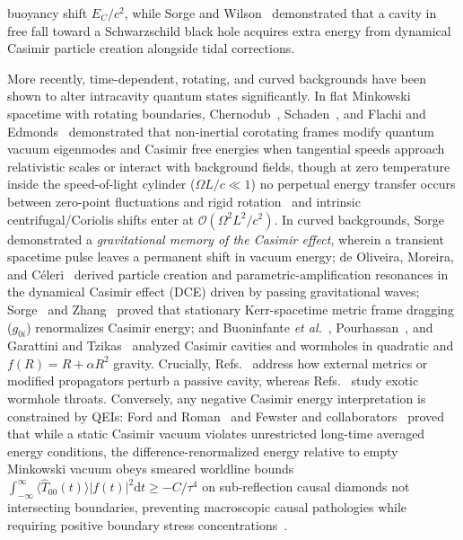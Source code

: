 \documentclass[aps,prd,twocolumn,10pt,showkeys,nofootinbib,floatfix,longbibliography]{revtex4-2}
\newcommand{\dd}{\mathrm{d}}
\begin{document}
buoyancy shift $E_C/c^2$, while Sorge and Wilson~\cite{sorge2019,wilson2020prd} demonstrated that a cavity in free fall toward a Schwarzschild black hole acquires extra energy from dynamical Casimir particle creation alongside tidal corrections.

More recently, time-dependent, rotating, and curved backgrounds have been shown to alter intracavity quantum states significantly. In flat Minkowski spacetime with rotating boundaries, Chernodub~\cite{chernodub2013prd}, Schaden~\cite{schaden2012arxiv}, and Flachi and Edmonds~\cite{flachi2023prd} demonstrated that non-inertial corotating frames modify quantum vacuum eigenmodes and Casimir free energies when tangential speeds approach relativistic scales or interact with background fields, though at zero temperature inside the speed-of-light cylinder ($\Omega L/c \ll 1$) no perpetual energy transfer occurs between zero-point fluctuations and rigid rotation~\cite{schaden2012arxiv} and intrinsic centrifugal/Coriolis shifts enter at $\mathcal{O}(\Omega^2 L^2/c^2)$. In curved backgrounds, Sorge~\cite{sorge2023memory} demonstrated a \emph{gravitational memory of the Casimir effect}, wherein a transient spacetime pulse leaves a permanent shift in vacuum energy; de Oliveira, Moreira, and Céleri~\cite{deoliveira2026entropy} derived particle creation and parametric-amplification resonances in the dynamical Casimir effect (DCE) driven by passing gravitational waves; Sorge~\cite{sorge2014kerr} and Zhang~\cite{zhang2017plb} proved that stationary Kerr-spacetime metric frame dragging ($g_{0i}$) renormalizes Casimir energy; and Buoninfante \emph{et al.}~\cite{buoninfante2019epjc}, Pourhassan~\cite{pourhassan2025epjc}, and Garattini and Tzikas~\cite{garattini2025epjc} analyzed Casimir cavities and wormholes in quadratic and $f(R) = R + \alpha R^2$ gravity. Crucially, Refs.~\cite{sorge2014kerr,sorge2023memory,deoliveira2026entropy,zhang2017plb,buoninfante2019epjc} address how external metrics or modified propagators perturb a passive cavity, whereas Refs.~\cite{pourhassan2025epjc,garattini2025epjc} study exotic wormhole throats. Conversely, any negative Casimir energy interpretation is constrained by QEIs: Ford and Roman~\cite{ford1995,ford1997} and Fewster and collaborators~\cite{fewster1998,fewster2006jmp,fewster2012} proved that while a static Casimir vacuum violates unrestricted long-time averaged energy conditions, the difference-renormalized energy relative to empty Minkowski vacuum obeys smeared worldline bounds $\int_{-\infty}^\infty \langle \hat{T}_{00}(t)\rangle |f(t)|^2 \dd t \ge -C/\tau^4$ on sub-reflection causal diamonds not intersecting boundaries, preventing macroscopic causal pathologies while requiring positive boundary stress concentrations~\cite{deutsch1979,graham2003,kontou2020}.
\end{document}
